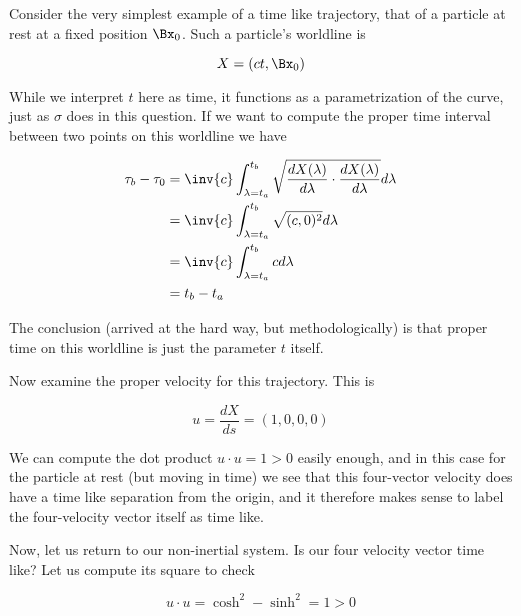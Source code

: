 {Consider the very simplest example of a time like trajectory, that of a particle at rest at a fixed position $\Bx_0$.  Such a particle's worldline is

\begin{equation}\label{eqn:relativisticElectrodynamicsT2:71}
X = ( c t, \Bx_0 )
\end{equation}

While we interpret $t$ here as time, it functions as a parametrization of the curve, just as $\sigma$ does in this question.  If we want to compute the proper time interval between two points on this worldline we have

\begin{equation}\label{eqn:relativisticElectrodynamicsT2:2140}
\begin{aligned}
\tau_b - \tau_0 
&=
\inv{c} \int_{\lambda = t_a}^{t_b} \sqrt{ \frac{dX(\lambda)}{d\lambda} \cdot \frac{dX(\lambda)}{d\lambda} } d\lambda \\
&=
\inv{c} \int_{\lambda = t_a}^{t_b} \sqrt{ (c, 0)^2 } d\lambda \\
&=
\inv{c} \int_{\lambda = t_a}^{t_b} c d\lambda \\
&= t_b - t_a
\end{aligned}
\end{equation}

The conclusion (arrived at the hard way, but methodologically) is that proper time on this worldline is just the parameter $t$ itself.

Now examine the proper velocity for this trajectory.  This is

\begin{equation}\label{eqn:relativisticElectrodynamicsT2:72}
u = \frac{dX}{ds} = (1, 0, 0, 0)
\end{equation}

We can compute the dot product $u \cdot u = 1 > 0$ easily enough, and in this case for the particle at rest (but moving in time) we see that this four-vector velocity does have a time like separation from the origin, and it therefore makes sense to label the four-velocity vector itself as time like.

Now, let us return to our non-inertial system.  Is our four velocity vector time like?  Let us compute its square to check

\begin{equation}\label{eqn:relativisticElectrodynamicsT2:90}
u \cdot u = \cosh^2 - \sinh^2 = 1 > 0
\end{equation}

}
